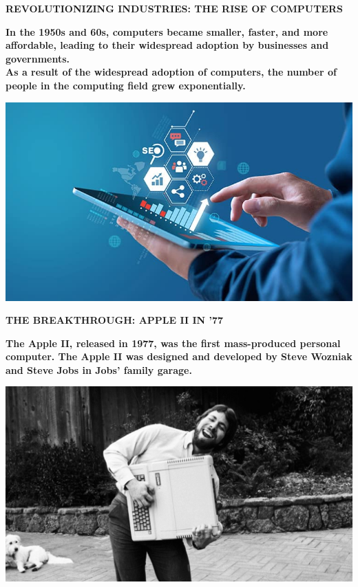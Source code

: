 \documentclass[pdf,aspectratio=169]{beamer}
\begin{document}
\begin{frame}{\textbf{REVOLUTIONIZING INDUSTRIES: THE RISE OF COMPUTERS}}
	\begin{minipage}{0.6\textwidth}
		\textbf{\text In the 1950s and 60s, computers became smaller, faster, and more affordable, leading to their widespread adoption by businesses and governments.}
		\\
		\textbf{\text As a result of the widespread adoption of computers, the number of people in the computing field grew exponentially.}
	\end{minipage}
	\hfill
	\begin{minipage}{0.3\textwidth}
		\centering
		\includegraphics[width=\textwidth]{figs/IMG2}
	\end{minipage}	
\end{frame}

\begin{frame}{\textbf{THE BREAKTHROUGH: APPLE II IN '77}}
	\begin{minipage}{0.6\textwidth}
		\textbf{\text The Apple II, released in 1977, was the first mass-produced personal computer. The Apple II was designed and developed by Steve Wozniak and Steve Jobs in Jobs' family garage.} 
	\end{minipage}
	\hfill
	\begin{minipage}{0.3\textwidth}
		\centering
		\includegraphics[width=\textwidth]{figs/IMG3}
	\end{minipage}
\end{frame}
\end{document}
